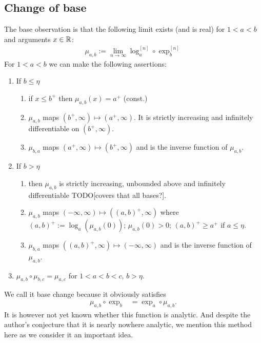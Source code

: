 \documentclass{article}
\numberwithin{equation}{section}
\begin{document}
\subsection{Change of base}
The base observation is that the following limit exists (and is real) for $1<a<b$
and arguments $x\in\mathbb{R}$:
\begin{align}
  \label{eq:changeofbase:limit}
  \mu_{a,b} := \lim_{n\to\infty} \log_a^{[n]}\circ\exp_b^{[n]}
\end{align}
For $1<a<b$ we can make the following assertions:
\begin{enumerate}
\item If $b\le\eta$ 
  \begin{enumerate}
  \item if $x\le b^+$ then $\mu_{a,b}(x)=a^+$ (const.) 
  \item \label{case:b} $\mu_{a,b}$ maps $(b^+,\infty)\mapsto(a^+,\infty)$. 
    It is strictly increasing and infinitely differentiable on
    $(b^+,\infty)$.
  \item $\mu_{b,a}$ maps $(a^+,\infty)\mapsto(b^+,\infty)$ and is the
    inverse function of $\mu_{a,b}$.
  \end{enumerate}
\item If $b>\eta$ 
  \begin{enumerate}
  \item then $\mu_{a,b}$ is strictly increasing, unbounded
    above and infinitely differentiable \cite{Viana:hairs} TODO[covers
    that all bases?].
  \item $\mu_{a,b}$ maps $(-\infty,\infty)\mapsto ((a,b)^+,\infty)$
    where $(a,b)^+:=\log_a(\mu_{a,b}(0))$; $\mu_{a,b}(0)>0$; $(a,b)^+\ge a^+$ if $a\le\eta$.
  \item $\mu_{b,a}$ maps $((a,b)^+,\infty)\mapsto (-\infty,\infty)$ and
    is the inverse function of $\mu_{a,b}$.
  \end{enumerate}
\item $\mu_{a,b}\circ \mu_{b,c} = \mu_{a,c}$ for $1<a<b<c$, $b>\eta$.
\end{enumerate}
We call it base change because it obviously satisfies
\begin{align}
  \label{eq:changeofbase:relation}
  \mu_{a,b}\circ \exp_b &= \exp_a \circ\mu_{a,b}.
\end{align}
It is however not yet known whether this function is analytic. And
despite the author's conjecture that it is nearly nowhere analytic, we
mention this method here as we consider it an important idea.
\end{document}
